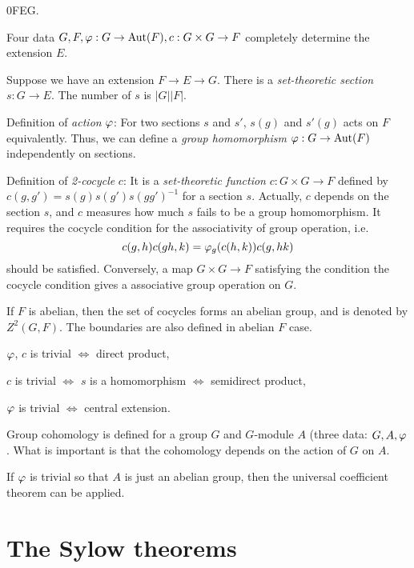 \documentclass{../note}
\begin{document}
\begin{es}
0\>F\>E\>G.
\end{es}
Four data $G,F,\varphi:G\to\operatorname{Aut}(F),c:G\times G\to F$ completely determine the extension $E$.

Suppose we have an extension $F\to E\to G$.
There is a \emph{set-theoretic section} $s:G\to E$.
The number of $s$ is $|G||F|$.

Definition of \emph{action} $\varphi$:
For two sections $s$ and $s'$, $s(g)$ and $s'(g)$ acts on $F$ equivalently.
Thus, we can define a \emph{group homomorphism} $\varphi:G\to\operatorname{Aut}(F)$ independently on sections.

Definition of \emph{2-cocycle} $c$:
It is a \emph{set-theoretic function} $c:G\times G\to F$ defined by $c(g,g')=s(g)s(g')s(gg')^{-1}$ for a section $s$.
Actually, $c$ depends on the section $s$, and $c$ measures how much $s$ fails to be a group homomorphism.
It requires the cocycle condition for the associativity of group operation, i.e.
\[c(g,h)c(gh,k)=\varphi_g(c(h,k))c(g,hk)\]
should be satisfied.
Conversely, a map $G\times G\to F$ satisfying the condition the cocycle condition gives a associative group operation on $G$.

If $F$ is abelian, then the set of cocycles forms an abelian group, and is denoted by $Z^2(G,F)$.
The boundaries are also defined in abelian $F$ case.


\begin{parts}
\item $\varphi$, $c$ is trivial $\iff$ direct product,
\item $c$ is trivial $\iff$ $s$ is a homomorphism $\iff$ semidirect product,
\item $\varphi$ is trivial $\iff$ central extension.
\end{parts}

Group cohomology is defined for a group $G$ and $G$-module $A$ (three data: $G,A,\varphi$.
What is important is that the cohomology depends on the action of $G$ on $A$.

If $\varphi$ is trivial so that $A$ is just an abelian group, then the universal coefficient theorem can be applied.












\chapter{The Sylow theorems}
\end{document}
